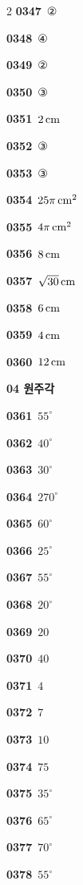 \documentclass[10pt,a4paper]{article}
\begin{document}
\begin{multicols}{2}
\noindent\textbf{0347}\ ②\par
\noindent\textbf{0348}\ ④\par
\noindent\textbf{0349}\ ②\par
\noindent\textbf{0350}\ ③\par
\noindent\textbf{0351}\ $2\mkern3mu \mathrm{cm}$\par
\noindent\textbf{0352}\ ③\par
\noindent\textbf{0353}\ ③\par
\noindent\textbf{0354}\ $25\pi\mkern3mu \mathrm{cm}^2$\par
\noindent\textbf{0355}\ $4\pi\mkern3mu \mathrm{cm}^2$\par
\noindent\textbf{0356}\ $8\mkern3mu \mathrm{cm}$\par
\noindent\textbf{0357}\ $\sqrt{30}\mkern3mu \mathrm{cm}$\par
\noindent\textbf{0358}\ $6\mkern3mu \mathrm{cm}$\par
\noindent\textbf{0359}\ $4\mkern3mu \mathrm{cm}$\par
\noindent\textbf{0360}\ $12\mkern3mu \mathrm{cm}$\par
\noindent\textbf{04 원주각}\par\smallskip
\noindent\textbf{0361}\ $55^\circ$\par
\noindent\textbf{0362}\ $40^\circ$\par
\noindent\textbf{0363}\ $30^\circ$\par
\noindent\textbf{0364}\ $270^\circ$\par
\noindent\textbf{0365}\ $60^\circ$\par
\noindent\textbf{0366}\ $25^\circ$\par
\noindent\textbf{0367}\ $55^\circ$\par
\noindent\textbf{0368}\ $20^\circ$\par
\noindent\textbf{0369}\ $20$\par
\noindent\textbf{0370}\ $40$\par
\noindent\textbf{0371}\ $4$\par
\noindent\textbf{0372}\ $7$\par
\noindent\textbf{0373}\ $10$\par
\noindent\textbf{0374}\ $75$\par
\noindent\textbf{0375}\ $35^\circ$\par
\noindent\textbf{0376}\ $65^\circ$\par
\noindent\textbf{0377}\ $70^\circ$\par
\noindent\textbf{0378}\ $55^\circ$\par

\end{multicols}
\end{document}
